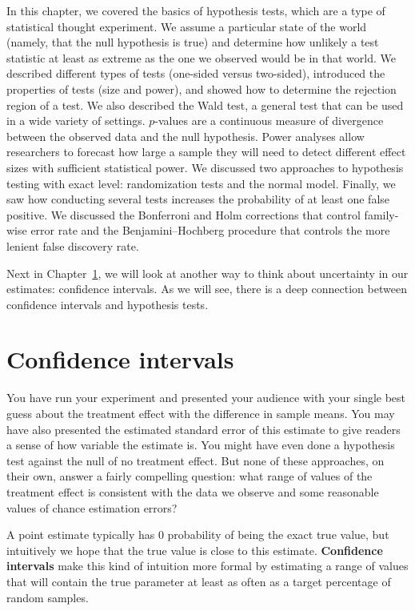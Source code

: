 \documentclass[
  13pt,
  letterpaper,
  DIV=11,
  numbers=noendperiod]{scrreprt}
\newcounter{none} %
\theoremstyle{plain}
\theoremstyle{plain}
\theoremstyle{definition}
\theoremstyle{definition}
\theoremstyle{remark}
\begin{document}
In this chapter, we covered the basics of hypothesis tests, which are a
type of statistical thought experiment. We assume a particular state of
the world (namely, that the null hypothesis is true) and determine how
unlikely a test statistic at least as extreme as the one we observed
would be in that world. We described different types of tests (one-sided
versus two-sided), introduced the properties of tests (size and power),
and showed how to determine the rejection region of a test. We also
described the Wald test, a general test that can be used in a wide
variety of settings. \(p\)-values are a continuous measure of divergence
between the observed data and the null hypothesis. Power analyses allow
researchers to forecast how large a sample they will need to detect
different effect sizes with sufficient statistical power. We discussed
two approaches to hypothesis testing with exact level: randomization
tests and the normal model. Finally, we saw how conducting several tests
increases the probability of at least one false positive. We discussed
the Bonferroni and Holm corrections that control family-wise error rate
and the Benjamini--Hochberg procedure that controls the more lenient
false discovery rate.

Next in Chapter~\ref{sec-confidence-intervals}, we will look at another
way to think about uncertainty in our estimates: confidence intervals.
As we will see, there is a deep connection between confidence intervals
and hypothesis tests.

\chapter{Confidence intervals}\label{sec-confidence-intervals}

You have run your experiment and presented your audience with your
single best guess about the treatment effect with the difference in
sample means. You may have also presented the estimated standard error
of this estimate to give readers a sense of how variable the estimate
is. You might have even done a hypothesis test against the null of no
treatment effect. But none of these approaches, on their own, answer a
fairly compelling question: what range of values of the treatment effect
is consistent with the data we observe and some reasonable values of
chance estimation errors?

A point estimate typically has 0 probability of being the exact true
value, but intuitively we hope that the true value is close to this
estimate. \textbf{Confidence intervals} make this kind of intuition more
formal by estimating a range of values that will contain the true
parameter at least as often as a target percentage of random samples.
\end{document}
